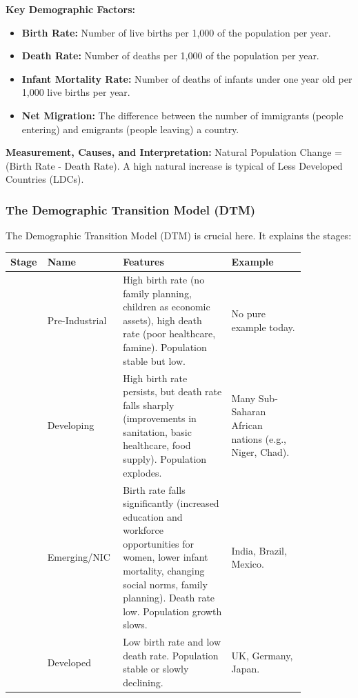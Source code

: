 \documentclass[11pt, a4paper, twoside]{book}
\begin{document}
\textbf{Key Demographic Factors:}
\begin{itemize}
  \item \textbf{Birth Rate:} Number of live births per 1,000 of the population per year.
  \item \textbf{Death Rate:} Number of deaths per 1,000 of the population per year.
  \item \textbf{Infant Mortality Rate:} Number of deaths of infants under one year old per 1,000 live births per year.
  \item \textbf{Net Migration:} The difference between the number of immigrants (people entering) and emigrants (people leaving) a country.
\end{itemize}

\textbf{Measurement, Causes, and Interpretation:} Natural Population Change = (Birth Rate - Death Rate). A high natural increase is typical of Less Developed Countries (LDCs).

\subsubsection{The Demographic Transition Model (DTM)}

The Demographic Transition Model (DTM) is crucial here. It explains the stages:

\begin{example}
\begin{tabular}{@{}>{\RaggedRight\arraybackslash}p{0.06\linewidth}>{\RaggedRight\arraybackslash}p{0.20\linewidth}>{\RaggedRight\arraybackslash}p{0.35\linewidth}>{\RaggedRight\arraybackslash}p{0.24\linewidth}@{}}
\textbf{Stage} & \textbf{Name} & \textbf{Features} & \textbf{Example} \\
\midrule
1 & Pre-Industrial & High birth rate (no family planning, children as economic assets), high death rate (poor healthcare, famine). Population stable but low. & No pure example today. \\
2 & Developing & High birth rate persists, but death rate falls sharply (improvements in sanitation, basic healthcare, food supply). Population explodes. & Many Sub-Saharan African nations (e.g., Niger, Chad). \\
3 & Emerging/NIC & Birth rate falls significantly (increased education and workforce opportunities for women, lower infant mortality, changing social norms, family planning). Death rate low. Population growth slows. & India, Brazil, Mexico. \\
4 & Developed & Low birth rate and low death rate. Population stable or slowly declining. & UK, Germany, Japan. \\
\end{tabular}
\end{example}
\end{document}
